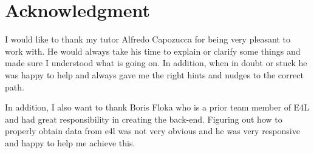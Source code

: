 \section*{Acknowledgment}

I would like to thank my tutor Alfredo Capozucca for being very
pleasant to work with. He would always take his time to explain or
clarify some things and made sure I understood what is going on. In
addition, when in doubt or stuck he was happy to help and always gave
me the right hints and nudges to the correct path.

In addition, I also want to thank Boris Floka who is a prior team
member of E4L and had great responsibility in creating the back-end.
Figuring out how to properly obtain data from \gls{e4l} was not very
obvious and he was very responsive and happy to help me achieve this.

